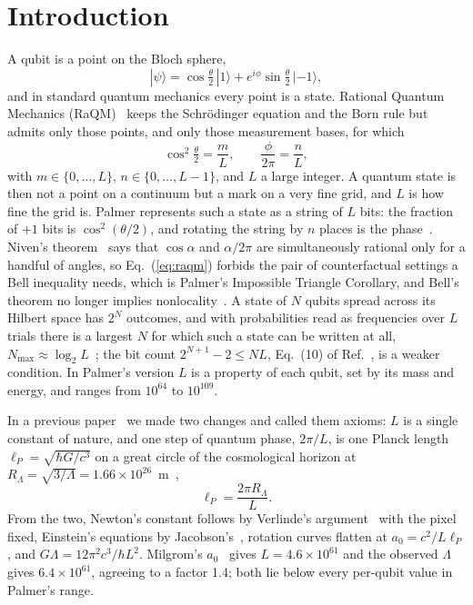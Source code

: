 \documentclass[aps,prd,twocolumn,superscriptaddress,nofootinbib]{revtex4-2}
\begin{document}
\section{Introduction}
\label{sec:intro}

A qubit is a point on the Bloch sphere,
\begin{equation}
|\psi\rangle = \cos\tfrac{\theta}{2}\,|1\rangle + e^{i\phi}\sin\tfrac{\theta}{2}\,|{-1}\rangle ,
\label{eq:qubit}
\end{equation}
and in standard quantum mechanics every point is a state. Rational Quantum Mechanics (RaQM)~\cite{palmer2020,palmer2026,palmer2026b,palmer2026c} keeps the Schr\"odinger equation and the Born rule but admits only those points, and only those measurement bases, for which
\begin{equation}
\cos^2\tfrac{\theta}{2} = \frac{m}{L},\qquad \frac{\phi}{2\pi} = \frac{n}{L},
\label{eq:raqm}
\end{equation}
with $m\in\{0,\dots,L\}$, $n\in\{0,\dots,L-1\}$, and $L$ a large integer. A quantum state is then not a point on a continuum but a mark on a very fine grid, and $L$ is how fine the grid is. Palmer represents such a state as a string of $L$ bits: the fraction of $+1$ bits is $\cos^2(\theta/2)$, and rotating the string by $n$ places is the phase~\cite{palmer2026}. Niven's theorem~\cite{niven1956} says that $\cos\alpha$ and $\alpha/2\pi$ are simultaneously rational only for a handful of angles, so Eq.~(\ref{eq:raqm}) forbids the pair of counterfactual settings a Bell inequality needs, which is Palmer's Impossible Triangle Corollary, and Bell's theorem no longer implies nonlocality~\cite{palmer2020,palmer2026b}. A state of $N$ qubits spread across its Hilbert space has $2^N$ outcomes, and with probabilities read as frequencies over $L$ trials there is a largest $N$ for which such a state can be written at all, $N_{\max}\approx\log_2L$~\cite{palmer2026}; the bit count $2^{N+1}-2 \le NL$, Eq.~(10) of Ref.~\cite{palmer2026}, is a weaker condition. In Palmer's version $L$ is a property of each qubit, set by its mass and energy, and ranges from $10^{64}$ to $10^{109}$.

In a previous paper~\cite{korytko2026} we made two changes and called them axioms: $L$ is a single constant of nature, and one step of quantum phase, $2\pi/L$, is one Planck length $\ell_P = \sqrt{\hbar G/c^3}$ on a great circle of the cosmological horizon at $R_\Lambda = \sqrt{3/\Lambda} = 1.66\times10^{26}$~m~\cite{planck2018},
\begin{equation}
\ell_P = \frac{2\pi R_\Lambda}{L} .
\label{eq:ident}
\end{equation}
From the two, Newton's constant follows by Verlinde's argument~\cite{verlinde2011} with the pixel fixed, Einstein's equations by Jacobson's~\cite{jacobson1995}, rotation curves flatten at $a_0 = c^2/L\ell_P$, and $G\Lambda = 12\pi^2c^3/\hbar L^2$. Milgrom's $a_0$~\cite{milgrom1983,mcgaugh2016} gives $L = 4.6\times10^{61}$ and the observed $\Lambda$ gives $6.4\times10^{61}$, agreeing to a factor 1.4; both lie below every per-qubit value in Palmer's range.
\end{document}
